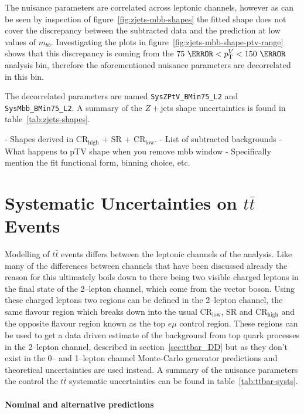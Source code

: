 The nuisance parameters are correlated across leptonic channels, however as can
be seen by inspection of figure~\ref{fig:zjets-mbb-shapes} the fitted shape does
not cover the discrepancy between the subtracted data and the prediction at low
values of $m_{bb}$. Investigating the plots in
figure~\ref{fig:zjets-mbb-shape-ptv-range} shows that this discrepancy is coming
from the $75~\GeV < p_{\mathrm{T}}^V < 150~\GeV$ analysis bin, therefore the aforementioned
nuisance parameters are decorrelated in this bin.

The decorrelated parameters are named \texttt{SysZPtV\_BMin75\_L2} and
\texttt{SysMbb\_BMin75\_L2}. A summary of the $Z+$jets shape uncertainties is
found in table~\ref{tab:zjets-shapes}.


- Shapes derived in CR$_{\text{high}}$ + SR + CR$_{\text{low}}$.
- List of subtracted backgrounds
- What happens to pTV shape when you remove mbb window
- Specifically mention the fit functional form, binning choice, etc. 

\section{Systematic Uncertainties on \texorpdfstring{$t\bar{t}$}{tt} Events}
\label{sec:ttbar-systs}
Modelling of $t\bar{t}$ events differs between the leptonic channels of the
analysis. Like many of the differences between channels that have been discussed
already the reason for this ultimately boils down to there being two visible
charged leptons in the final state of the 2--lepton channel, which come from the
vector boson. Using these charged leptons two regions can be defined in the
2--lepton channel, the same flavour region which breaks down into the usual
CR$_{\text{low}}$, SR and CR$_{\text{high}}$ and the opposite flavour region
known as the top $e\mu$ control region. These regions can be used to get a data
driven estimate of the background from top quark processes in the 2--lepton
channel, described in section~\ref{sec:ttbar_DD} but as they don't exist in the
0-- and 1--lepton channel Monte-Carlo generator predictions and theoretical
uncertainties are used instead. A summary of the nuisance parameters the control
the $t\bar{t}$ systematic uncertainties can be found in
table~\ref{tab:ttbar-systs}.


\paragraph{Nominal and alternative predictions}

